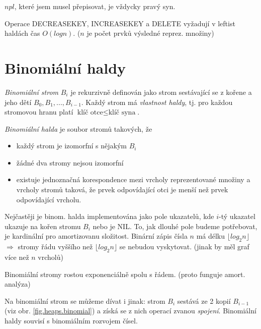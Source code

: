 \begin{pozn}
$npl$, které jsem musel přepisovat, je vždycky pravý syn.
\end{pozn}

\begin{theorem}
Operace DECREASEKEY, INCREASEKEY a DELETE vyžadují v leftist
haldách čas $O(log n)$. ($n$ je počet prvků výsledné reprez. množiny)
\end{theorem}


\section{Binomiální haldy}

\begin{defn}
\emph{Binomiální strom} $B_i$ je rekurzivně definován jako strom 
sestávající se z
kořene a jeho dětí $B_0, B_1, ..., B_{i-1}$. Každý strom má \emph{vlastnost
haldy}, tj. pro každou stromovou hranu platí $\text{klíč otce} \leq
\text{klíč syna}$.
\end{defn}

\begin{defn}
\label{def.binomheap}
\emph{Binomiální halda} je soubor stromů takových, že
\begin{itemize}
\item každý strom je izomorfní s nějakým $B_i$
\item žádné dva stromy nejsou izomorfní
\item existuje jednoznačná korespondence mezi vrcholy reprezentované
množiny a vrcholy stromů taková, že prvek odpovídající otci je menší než
prvek odpovídající vrcholu.
\end{itemize}
\end{defn}

\begin{pozn}
Nejčastěji je binom. halda implementována jako pole ukazatelů, kde $i$-tý
ukazatel ukazuje na kořen stromu $B_i$ nebo je NIL. To, jak dlouhé pole
budeme potřebovat, je kardinální pro amortizovanu složitost. Binární zápis
čísla $n$ má délku $\lfloor log_2 n \rfloor$ $\Rightarrow$ stromy řádu
vyššího než $\lfloor log_2 n \rfloor$ se nebudou vyskytovat. (jinak by měl
graf více než $n$ vrcholů)

Binomiální stromy rostou exponenciálně spolu s řádem. (proto funguje
amort. analýza)
\end{pozn}

\begin{pozn}
Na binomiální strom se můžeme dívat i jinak: strom $B_i$ sestává ze 2
kopií $B_{i-1}$ (viz obr. \ref{fig.heaps.binomial})
a získá se z nich operací zvanou \emph{spojení}. 
Binomiální haldy souvisí s binomiálním rozvojem čísel.
\end{pozn}

